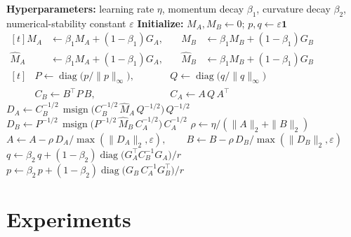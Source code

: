 \documentclass[11pt]{article}
\DeclareMathOperator{\diag}{diag}
\DeclareMathOperator{\msign}{msign}          %
\newcommand{\norm}[1]{\| #1\|}
\newcommand{\methodname}{PoLoRA\xspace}
\theoremstyle{plain}
\theoremstyle{definition}
\theoremstyle{remark}
\theoremstyle{definition}
\begin{document}
\begin{algorithm}[t]
\caption{\methodname{} step for one LoRA pair $(A,B)$}
\label{alg:ours}
\begin{algorithmic}[1]
\Statex \textbf{Hyperparameters:} learning rate $\eta$, momentum decay $\beta_1$, curvature decay $\beta_2$, numerical-stability constant $\varepsilon$
\Statex \textbf{Initialize:} $M_A, M_B \gets 0$; \quad $p, q \gets \varepsilon\mathbf{1}$
\Statex
{}
\State $\begin{aligned}[t]
  M_A &\gets \beta_1 M_A+(1-\beta_1)G_A, &\quad M_B &\gets \beta_1 M_B+(1-\beta_1)G_B\\[-4pt]
  \widehat M_A &\gets \beta_1 M_A+(1-\beta_1)G_A, &\quad \widehat M_B &\gets \beta_1 M_B+(1-\beta_1)G_B
\end{aligned}$  \label{ln:mom}
\Statex
{}
\State $\begin{aligned}[t]
  &P \gets \diag\!\big(p/\norm{p}_\infty\big), &&\qquad Q \gets \diag\!\big(q/\norm{q}_\infty\big)\\[-4pt]
  &C_B \gets B^\top P\, B, &&\qquad C_A \gets A\,Q\, A^\top
\end{aligned}$  \label{ln:pqnorm}
\State $D_A\gets C_B^{-1/2}\,\msign\big(C_B^{-1/2}\,\widehat M_A\,Q^{-1/2}\big)\,Q^{-1/2}$  \label{ln:Aspectral}
\State $D_B\gets P^{-1/2}\,\msign\big(P^{-1/2}\,\widehat M_B\,C_A^{-1/2}\big)\,C_A^{-1/2}$  \label{ln:Bspectral}
\Statex
{}
\State $\rho\gets\eta/(\norm{A}_2+\norm{B}_2)$  \label{ln:rho}
\State $A\gets A-\rho\,D_A/\max(\norm{D_A}_2,\varepsilon), \qquad B\gets B-\rho\,D_B/\max(\norm{D_B}_2,\varepsilon)$ \label{ln:spectralnormupdate}
\Statex
{}
\State $q\gets\beta_2\, q+(1-\beta_2)\diag\big(G_A^\top C_B^{-1} G_A\big)/r$   \label{ln:qmom}
\State $p\gets\beta_2\, p+(1-\beta_2)\diag\big(G_B\, C_A^{-1} G_B^\top\big)/r$  \label{ln:pmom}
\end{algorithmic}
\end{algorithm}
% 

\section{Experiments}
\label{sec:exp}
\end{document}

